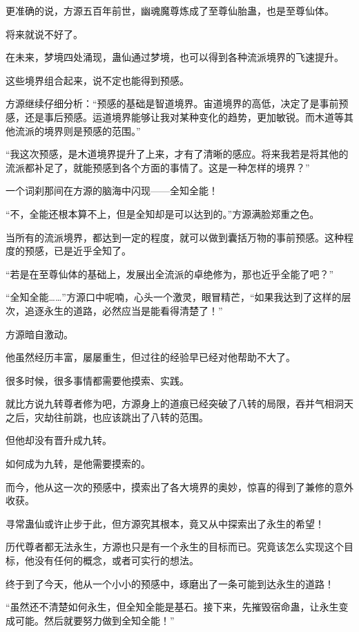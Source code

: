 \begin{this_body}
更准确的说，方源五百年前世，幽魂魔尊炼成了至尊仙胎蛊，也是至尊仙体。

将来就说不好了。

在未来，梦境四处涌现，蛊仙通过梦境，也可以得到各种流派境界的飞速提升。

这些境界组合起来，说不定也能得到预感。

方源继续仔细分析：“预感的基础是智道境界。宙道境界的高低，决定了是事前预感，还是事后预感。运道境界能够让我对某种变化的趋势，更加敏锐。而木道等其他流派的境界则是预感的范围。”

“我这次预感，是木道境界提升了上来，才有了清晰的感应。将来我若是将其他的流派都补足了，就能预感到各个方面的事情了。这是一种怎样的境界？”

一个词刹那间在方源的脑海中闪现——全知全能！

“不，全能还根本算不上，但是全知却是可以达到的。”方源满脸郑重之色。

当所有的流派境界，都达到一定的程度，就可以做到囊括万物的事前预感。这种程度的预感，已是近乎全知了。

“若是在至尊仙体的基础上，发展出全流派的卓绝修为，那也近乎全能了吧？”

“全知全能……”方源口中呢喃，心头一个激灵，眼冒精芒，“如果我达到了这样的层次，追逐永生的道路，必然应当是能看得清楚了！”

方源暗自激动。

他虽然经历丰富，屡屡重生，但过往的经验早已经对他帮助不大了。

很多时候，很多事情都需要他摸索、实践。

就比方说九转尊者修为吧，方源身上的道痕已经突破了八转的局限，吞并气相洞天之后，灾劫往前跳，也应该跳出了八转的范围。

但他却没有晋升成九转。

如何成为九转，是他需要摸索的。

而今，他从这一次的预感中，摸索出了各大境界的奥妙，惊喜的得到了兼修的意外收获。

寻常蛊仙或许止步于此，但方源究其根本，竟又从中探索出了永生的希望！

历代尊者都无法永生，方源也只是有一个永生的目标而已。究竟该怎么实现这个目标，他没有任何的概念，或者可实行的想法。

终于到了今天，他从一个小小的预感中，琢磨出了一条可能到达永生的道路！

“虽然还不清楚如何永生，但全知全能是基石。接下来，先摧毁宿命蛊，让永生变成可能。然后就要努力做到全知全能！”


\end{this_body}
